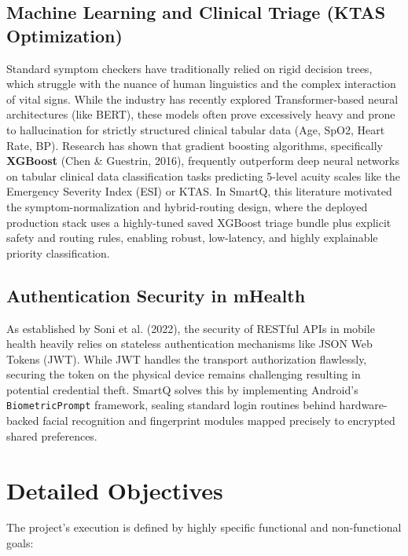 \documentclass[12pt,a4paper]{article}
\begin{document}
\subsection{Machine Learning and Clinical Triage (KTAS Optimization)}
Standard symptom checkers have traditionally relied on rigid decision trees, which struggle with the nuance of human linguistics and the complex interaction of vital signs. While the industry has recently explored Transformer-based neural architectures (like BERT), these models often prove excessively heavy and prone to hallucination for strictly structured clinical tabular data (Age, SpO2, Heart Rate, BP). Research has shown that gradient boosting algorithms, specifically \textbf{XGBoost} (Chen \& Guestrin, 2016), frequently outperform deep neural networks on tabular clinical data classification tasks predicting 5-level acuity scales like the Emergency Severity Index (ESI) or KTAS. In SmartQ, this literature motivated the symptom-normalization and hybrid-routing design, where the deployed production stack uses a highly-tuned saved XGBoost triage bundle plus explicit safety and routing rules, enabling robust, low-latency, and highly explainable priority classification. 

\subsection{Authentication Security in mHealth}
As established by Soni et al. (2022), the security of RESTful APIs in mobile health heavily relies on stateless authentication mechanisms like JSON Web Tokens (JWT). While JWT handles the transport authorization flawlessly, securing the token on the physical device remains challenging resulting in potential credential theft. SmartQ solves this by implementing Android's \texttt{BiometricPrompt} framework, sealing standard login routines behind hardware-backed facial recognition and fingerprint modules mapped precisely to encrypted shared preferences.

\section{Detailed Objectives}

The project's execution is defined by highly specific functional and non-functional goals:
\end{document}
